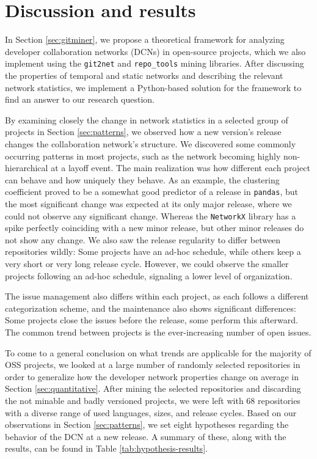 \section{Discussion and results}

In Section \ref{sec:gitminer}, we propose a theoretical framework for analyzing developer collaboration networks (DCNs) in open-source projects, which we also implement using the \texttt{git2net} and \texttt{repo\_tools} mining libraries. After discussing the properties of temporal and static networks and describing the relevant network statistics, we implement a Python-based solution for the framework to find an answer to our research question.

By examining closely the change in network statistics in a selected group of projects in Section \ref{sec:patterns}, we observed how a new version's release changes the collaboration network's structure. We discovered some commonly occurring patterns in most projects, such as the network becoming highly non-hierarchical at a layoff event. The main realization was how different each project can behave and how uniquely they behave. As an example, the clustering coefficient proved to be a somewhat good predictor of a release in \texttt{pandas}, but the most significant change was expected at its only major release, where we could not observe any significant change. Whereas the \texttt{NetworkX} library has a spike perfectly coinciding with a new minor release, but other minor releases do not show any change. We also saw the release regularity to differ between repositories wildly: Some projects have an ad-hoc schedule, while others keep a very short or very long release cycle. However, we could observe the smaller projects following an ad-hoc schedule, signaling a lower level of organization.

The issue management also differs within each project, as each follows a different categorization scheme, and the maintenance also shows significant differences: Some projects close the issues before the release, some perform this afterward. The common trend between projects is the ever-increasing number of open issues.

To come to a general conclusion on what trends are applicable for the majority of OSS projects, we looked at a large number of randomly selected repositories in order to generalize how the developer network properties change on average in Section \ref{sec:quantitative}. After mining the selected repositories and discarding the not minable and badly versioned projects, we were left with 68 repositories with a diverse range of used languages, sizes, and release cycles. Based on our observations in Section \ref{sec:patterns}, we set eight hypotheses regarding the behavior of the DCN at a new release. A summary of these, along with the results, can be found in Table \ref{tab:hypothesis-results}. 

